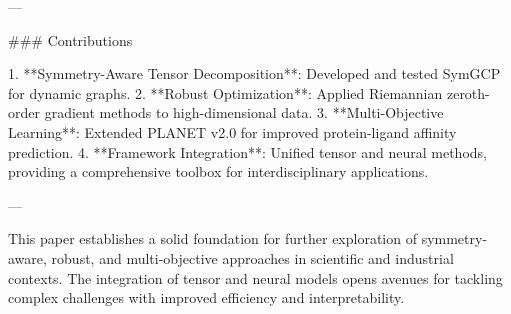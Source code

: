 ---

### Contributions

1. **Symmetry-Aware Tensor Decomposition**: Developed and tested SymGCP for dynamic graphs.
2. **Robust Optimization**: Applied Riemannian zeroth-order gradient methods to high-dimensional data.
3. **Multi-Objective Learning**: Extended PLANET v2.0 for improved protein-ligand affinity prediction.
4. **Framework Integration**: Unified tensor and neural methods, providing a comprehensive toolbox for interdisciplinary applications.

---

This paper establishes a solid foundation for further exploration of symmetry-aware, robust, and multi-objective approaches in scientific and industrial contexts. The integration of tensor and neural models opens avenues for tackling complex challenges with improved efficiency and interpretability.